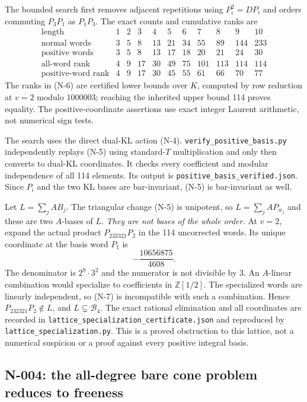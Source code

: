 The bounded search first removes adjacent repetitions using
$P_i^2=DP_i$ and orders commuting $P_3P_1$ as $P_1P_3$.
The exact counts and cumulative ranks are
\[
\begin{array}{c|rrrrrrrrrr}
\text{length}&1&2&3&4&5&6&7&8&9&10\\\hline
\text{normal words}&3&5&8&13&21&34&55&89&144&233\\
\text{positive words}&3&5&8&13&17&18&20&21&24&30\\
\text{all-word rank}&4&9&17&30&49&75&101&113&114&114\\
\text{positive-word rank}&4&9&17&30&45&55&61&66&70&77
\end{array}
\tag{N-6}
\]
The ranks in (N-6) are certified lower bounds over $K$, computed by
row reduction at $v=2$ modulo 1000003; reaching the inherited upper
bound 114 proves equality.  The positive-coordinate assertions use
exact integer Laurent arithmetic, not numerical sign tests.

The search uses the direct dual-KL action (N-4).
\nolinkurl{verify_positive_basis.py} independently replays (N-5) using
standard-$T$ multiplication and only then converts to dual-KL
coordinates.  It checks every coefficient and modular independence of
all 114 elements.  Its output is
\nolinkurl{positive_basis_verified.json}.  Since $P_i$ and the two KL
bases are bar-invariant, (N-5) is bar-invariant as well.

Let $L=\sum_j A B_j$.  The triangular change (N-5) is unipotent, so
$L=\sum_j A P_{w_j}$ and these are two $A$-bases of $L$.
\emph{They are not bases of the whole order.}  At $v=2$, expand the
actual product $P_{232321}P_2$ in the 114 uncorrected words.  Its unique
coordinate at the basis word $P_1$ is
\[
                            -\frac{10656875}{4608}.
 \tag{N-7}
\]
The denominator is $2^9\cdot3^2$ and the numerator is not divisible by
3.  An $A$-linear combination would specialize to coefficients in
$\mathbb Z[1/2]$.  The specialized words are linearly independent, so
(N-7) is incompatible with such a combination.  Hence
$P_{232321}P_2\notin L$, and $L\subsetneq\mathcal B_4$.
The exact rational elimination and all coordinates are recorded in
\nolinkurl{lattice_specialization_certificate.json} and reproduced by
\nolinkurl{lattice_specialization.py}.  This is a proved obstruction to
this lattice, not a numerical suspicion or a proof against every
positive integral basis.

\subsection{N-004: the all-degree bare cone problem reduces to freeness}

